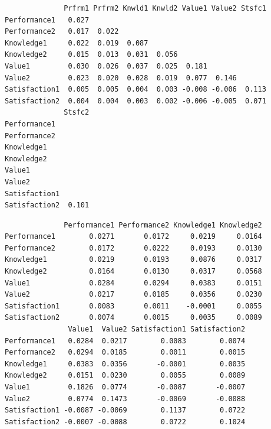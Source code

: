 \begin{Shaded}
\begin{Highlighting}[]
\OperatorTok{$}
\end{Highlighting}
\end{Shaded}

\begin{verbatim}
              Prfrm1 Prfrm2 Knwld1 Knwld2 Value1 Value2 Stsfc1
Performance1   0.027                                          
Performance2   0.017  0.022                                   
Knowledge1     0.022  0.019  0.087                            
Knowledge2     0.015  0.013  0.031  0.056                     
Value1         0.030  0.026  0.037  0.025  0.181              
Value2         0.023  0.020  0.028  0.019  0.077  0.146       
Satisfaction1  0.005  0.005  0.004  0.003 -0.008 -0.006  0.113
Satisfaction2  0.004  0.004  0.003  0.002 -0.006 -0.005  0.071
              Stsfc2
Performance1        
Performance2        
Knowledge1          
Knowledge2          
Value1              
Value2              
Satisfaction1       
Satisfaction2  0.101
\end{verbatim}

\begin{Shaded}
\begin{Highlighting}[]
\end{Highlighting}
\end{Shaded}

\begin{verbatim}
              Performance1 Performance2 Knowledge1 Knowledge2
Performance1        0.0271       0.0172     0.0219     0.0164
Performance2        0.0172       0.0222     0.0193     0.0130
Knowledge1          0.0219       0.0193     0.0876     0.0317
Knowledge2          0.0164       0.0130     0.0317     0.0568
Value1              0.0284       0.0294     0.0383     0.0151
Value2              0.0217       0.0185     0.0356     0.0230
Satisfaction1       0.0083       0.0011    -0.0001     0.0055
Satisfaction2       0.0074       0.0015     0.0035     0.0089
               Value1  Value2 Satisfaction1 Satisfaction2
Performance1   0.0284  0.0217        0.0083        0.0074
Performance2   0.0294  0.0185        0.0011        0.0015
Knowledge1     0.0383  0.0356       -0.0001        0.0035
Knowledge2     0.0151  0.0230        0.0055        0.0089
Value1         0.1826  0.0774       -0.0087       -0.0007
Value2         0.0774  0.1473       -0.0069       -0.0088
Satisfaction1 -0.0087 -0.0069        0.1137        0.0722
Satisfaction2 -0.0007 -0.0088        0.0722        0.1024
\end{verbatim}

